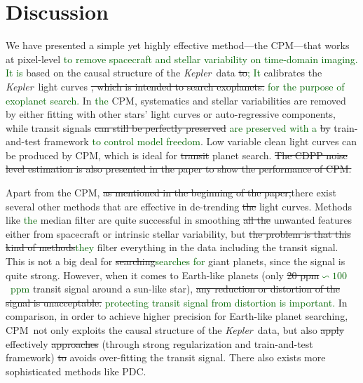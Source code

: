 \documentclass[12pt, preprint]{aastex}
\newcommand{\project}[1]{\textsl{#1}}
\newcommand{\Kepler}{\project{Kepler}}
\newcommand{\name}{CPM}
\newcommand{\revise}[1]{\textcolor{darkgreen}{#1}}
\newcommand{\remove}[1]{\sout{#1}}
\begin{document}
\section{Discussion}
We have presented a simple yet highly effective method---the \name---that works at pixel-level \revise{to remove spacecraft and stellar variability on time-domain imaging. It is} based on the causal structure of the \Kepler\ data \remove{to}\revise{; It} calibrates the \Kepler\ light curves \remove{, which is intended to search exoplanets.} \revise{for the purpose of exoplanet search.}
In \revise{the} \name, systematics and stellar variabilities are removed by either fitting with other stars' light curves or auto-regressive components, while transit signals \remove{can still be perfectly preserved} \revise{are preserved with a} \remove{by} train-and-test framework \revise{to control model freedom}.
Low variable clean light curves can be produced by \name,  
  which is ideal for \remove{transit} planet search. 
\remove{The CDPP noise level estimation is also presented in the paper to show the performance of \name.} 

Apart from the \name, \remove{as mentioned in the beginning of the paper,}there exist several other methods that are effective in de-trending \remove{the} light curves.
Methods like \revise{the} median filter are quite successful in smoothing \remove{all the} unwanted features 
  either from spacecraft or intrinsic stellar variability, 
  but \remove{the problem is that this kind of methods}\revise{they} filter everything in the data including the transit signal. 
This is not a big deal for \remove{searching}\revise{searches for} giant planets, since the signal is quite strong. 
However, 
  when it comes to Earth-like planets (only \remove{20 ppm}\revise{$\backsim 100$\ ppm} transit signal around a sun-like star),
  \remove{any reduction or distortion of the signal is unacceptable.}
  \revise{protecting transit signal from distortion is important.} 
In comparison, in order to achieve higher precision for Earth-like planet searching, 
  \name\  not only exploits the causal structure of the \Kepler\ data,
  but also \remove{apply} effectively \remove{approaches} (through strong regularization and train-and-test framework)
  \remove{to} avoids over-fitting the transit signal.
There also exists more sophisticated methods like PDC.
\end{document}
